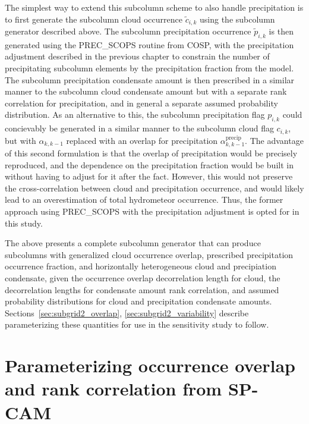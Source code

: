 The simplest way to extend this subcolumn scheme to also handle
precipitation is to first generate the subcolumn cloud occurrence
\(\tilde{c}_{i, k}\) using the subcolumn generator described above. The
subcolumn precipitation occurrence \(\tilde{p}_{i, k}\) is then
generated using the PREC\_SCOPS routine from COSP, with the
precipitation adjustment described in the previous chapter to constrain
the number of precipitating subcolumn elements by the precipitation
fraction from the model. The subcolumn precipitation condensate amount
is then prescribed in a similar manner to the subcolumn cloud condensate
amount but with a separate rank correlation for precipitation, and in
general a separate assumed probability distribution. As an alternative
to this, the subcolumn precipitation flag \(p_{i, k}\) could concievably
be generated in a similar manner to the subcolumn cloud flag
\(c_{i, k}\), but with \(\alpha_{k, k-1}\) replaced with an overlap for
precipitation \(\alpha^\textrm{precip}_{k, k-1}\). The advantage of this
second formulation is that the overlap of precipitation would be
precisely reproduced, and the dependence on the precipitation fraction
would be built in without having to adjust for it after the fact.
However, this would not preserve the cross-correlation between cloud and
precipitation occurrence, and would likely lead to an overestimation of
total hydrometeor occurrence. Thus, the former approach using
PREC\_SCOPS with the precipitation adjustment is opted for in this
study.

The above presents a complete subcolumn generator that can produce
subcolumns with generalized cloud occurrence overlap, prescribed
precipitation occurrence fraction, and horizontally heterogeneous cloud
and precipiation condensate, given the occurrence overlap decorrelation
length for cloud, the decorrelation lengths for condensate amount rank
correlation, and assumed probability distributions for cloud and
precipitation condensate amounts.
Sections~\ref{sec:subgrid2_overlap}, \ref{sec:subgrid2_variability}
describe parameterizing these quantities for use in the sensitivity
study to follow.

\section{Parameterizing occurrence overlap and rank correlation from
SP-CAM}\label{sec:subgrid2ux5foverlap}

